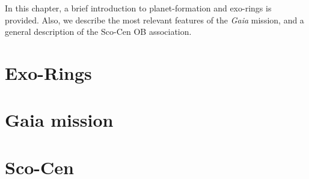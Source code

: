 In this chapter, a brief introduction to planet-formation and exo-rings is provided. Also, we describe the most relevant features of the \textit{Gaia} mission, and a general description of the Sco-Cen OB association. 

\section{Exo-Rings}
\section{Gaia mission}
\section{Sco-Cen}



